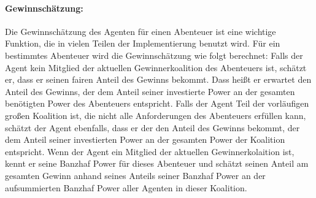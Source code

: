 \documentclass[fleqn,10pt]{SelfArx} %
\begin{document}
\paragraph{Gewinnschätzung:}
Die Gewinnschätzung des Agenten für einen Abenteuer ist eine wichtige Funktion, die in vielen Teilen der Implementierung benutzt wird.
Für ein bestimmtes Abenteuer wird die Gewinnschätzung wie folgt berechnet: Falls der Agent kein Mitglied der aktuellen Gewinnerkoalition des Abenteuers ist, schätzt er, dass er seinen fairen Anteil des Gewinns bekommt. Dass heißt er erwartet den Anteil des Gewinns, der dem Anteil seiner investierte Power an der gesamten benötigten Power des Abenteuers entspricht. Falls der Agent Teil der vorläufigen großen Koalition ist, die nicht alle Anforderungen des Abenteuers erfüllen kann, schätzt der Agent ebenfalls, dass er der den Anteil des Gewinns bekommt, der dem Anteil seiner investierten Power an der gesamten Power der Koalition entspricht. Wenn der Agent ein Mitglied der aktuellen Gewinnerkolaition ist, kennt er seine Banzhaf Power für dieses Abenteuer und schätzt seinen Anteil am gesamten Gewinn anhand seines Anteils seiner Banzhaf Power an der aufsummierten Banzhaf Power aller Agenten in dieser Koalition.
\end{document}
